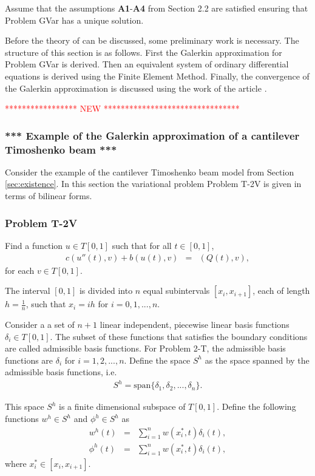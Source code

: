 \documentclass[../../main.tex]{subfiles}
\begin{document}
Assume that the assumptions \textbf{A1}-\textbf{A4} from Section 2.2 are
satisfied ensuring that Problem GVar has a unique solution.

Before the theory of \cite{BV13} can be discussed, some preliminary work is
necessary. The structure of this section is as follows. First the Galerkin
approximation for Problem GVar is derived. Then an equivalent system of
ordinary differential equations is derived using the Finite Element Method.
Finally, the convergence of the Galerkin approximation is discussed using the
work of the article \cite{BV13}.

\textcolor{red}{***************** NEW ********************************}

\subsubsection{*** Example of the Galerkin approximation of a cantilever Timoshenko beam ***}
Consider the example of the cantilever Timoshenko beam model from Section \ref{sec:existence}. In this section the variational problem Problem T-2V is given in terms of bilinear forms.

\subsubsection{Problem T-2V}
Find a function $u \in T[0,1]$ such that for all $t \in [0,1]$,
\begin{eqnarray*}
	c(u''(t),v) + b(u(t),v) & = & (Q(t),v),
\end{eqnarray*} for each $v \in T[0,1]$.

The interval $[0,1]$ is divided into $n$ equal subintervals $[x_{i}, x_{i+1}]$, each of length $\displaystyle h = \frac{1}{n}$, such that $x_i = ih$ for $i = 0,1,...,n$.

Consider a a set of $n+1$ linear independent, piecewise linear basis functions $\delta_i \in T[0,1]$. The subset of these functions that satisfies the boundary conditions are called admissible basis functions. For Problem 2-T, the admissible basis functions are ${\delta_i}$ for $i = 1,2,...,n$. Define the space $S^h$ as the space spanned by the admissible basis functions, i.e.
\begin{eqnarray*}
	S^h = \textrm{span}\{\delta_1, \delta_2, ..., \delta_n\}.
\end{eqnarray*}

This space $S^h$ is a finite dimensional subspace of $T[0,1]$. Define the following functions $w^h \in S^h$ and $\phi^h \in S^h$ as
\begin{eqnarray*}
	w^h(t) & = & \sum_{i=1}^{n} w(x_i^*,t) \delta_i(t),\\
	\phi^h(t) & = & \sum_{i=1}^{n} w(x_i^*,t) \delta_i(t),
\end{eqnarray*} where $x^*_i \in [x_i, x_{i+1}]$.
\end{document}
